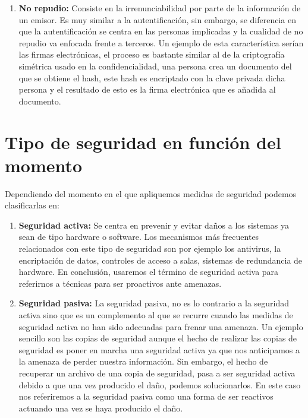 \begin{enumerate}
\item {\bfseries No repudio:}
Consiste en la irrenunciabilidad por parte de la información de un emisor. Es muy similar a la autentificación, sin embargo, se diferencia en que la autentificación se centra en las personas implicadas y la cualidad de no repudio va enfocada frente a terceros. Un ejemplo de esta característica serían las firmas electrónicas, el proceso es bastante similar al de la criptografía simétrica usado en la confidencialidad, una persona crea un documento del que se obtiene el hash, este hash es encriptado con la clave privada dicha persona y el resultado de esto es la firma electrónica que es añadida al documento.\cite{caracteristicasseguridad}
\end{enumerate}
\section{Tipo de seguridad en función del momento} 
Dependiendo del momento en el que apliquemos medidas de seguridad podemos clasificarlas en: 
\begin{enumerate}
\item {\bfseries Seguridad activa:}
Se centra en prevenir y evitar daños a los sistemas ya sean de tipo hardware o software. Los mecanismos más frecuentes relacionados con este tipo de seguridad son por ejemplo los antivirus, la encriptación de datos, controles de acceso a salas, sistemas de redundancia de hardware. En conclusión, usaremos el término de seguridad activa para referirnos a técnicas para ser proactivos ante amenazas. 
\item {\bfseries Seguridad pasiva:}
La seguridad pasiva, no es lo contrario a la seguridad activa sino que es un complemento al que se recurre cuando las medidas de seguridad activa no han sido adecuadas para frenar una amenaza. Un ejemplo sencillo son las copias de seguridad aunque el hecho de realizar las copias de seguridad es poner en marcha una seguridad activa ya que nos anticipamos a la amenaza de perder nuestra información. Sin embargo, el hecho de recuperar un archivo de una copia de seguridad, pasa a ser seguridad activa debido a que una vez producido el daño, podemos solucionarlos. En este caso nos referiremos a la seguridad pasiva como una forma de ser reactivos actuando una vez se haya producido el daño.\cite{activaypasiva}
 \end{enumerate}




